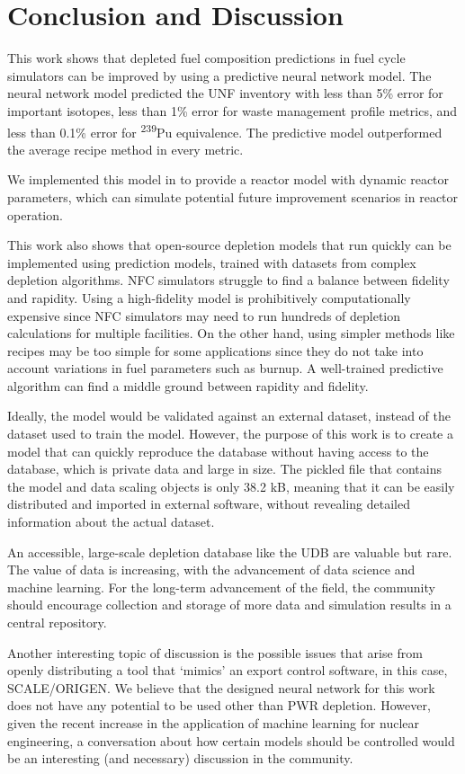 \section{Conclusion and Discussion}

This work shows that depleted fuel composition predictions
in fuel cycle simulators can be improved
by using a predictive neural network  model.
The neural network model predicted the \gls{UNF} inventory
with less than 5\% error for important isotopes,
less than 1\% error for waste management profile metrics, 
and less than 0.1\% error for \textsuperscript{239}Pu equivalence.
The predictive model outperformed the average recipe
method in every metric.

We implemented this model in \Cyclus to provide a
 reactor model with dynamic reactor parameters,
which can simulate potential future improvement scenarios
in reactor operation.

This work also shows that open-source depletion models
that run quickly
can be implemented using prediction models, trained
with datasets from complex depletion algorithms.
\gls{NFC} simulators struggle to find a balance
between fidelity and rapidity. Using a high-fidelity
model is prohibitively computationally expensive
since \gls{NFC} simulators may need to run
hundreds of depletion calculations for multiple
facilities. On the other hand, using simpler methods
like recipes may be too simple for some applications
since they do not take into account variations in fuel
parameters such as burnup.
A well-trained predictive algorithm can find a middle
ground between rapidity and fidelity.

Ideally, the model would be validated against an external
dataset, instead of the dataset used to train the model.
 However, the purpose
of this work is to create a model that can quickly reproduce the
database without having access to the database, which is private
data
and large in size. The pickled file that contains
the model and data scaling objects is only 38.2 kB, meaning that it
can be easily distributed and imported in external software, without
revealing detailed information about the actual dataset.

An accessible, large-scale depletion database 
like the \gls{UDB} are valuable
but rare. The value of data is increasing,
with the advancement of data science and machine learning.
For the long-term advancement of the field, the
community should encourage collection and storage of more
data and simulation results in
a central repository.

Another interesting topic of discussion is the possible
issues that arise from openly distributing a tool that `mimics'
an export control software, in this case, SCALE/ORIGEN. We believe
that the designed neural network for this work does not have any
potential to be used other than \gls{PWR} depletion. However, given
the recent increase in the application of machine learning
for nuclear engineering, a conversation about how certain models should
be controlled would be an interesting (and necessary) discussion in the community.

